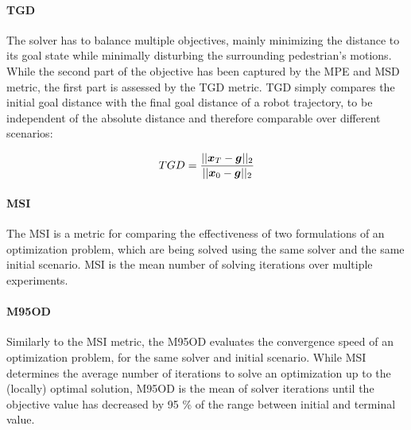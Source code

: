 \paragraph{\ac{TGD}}
The solver has to balance multiple objectives, mainly minimizing the distance to its goal state while minimally disturbing the surrounding pedestrian's motions. While the second part of the objective has been captured by the MPE and MSD metric, the first part is assessed by the \ac{TGD} metric. \ac{TGD} simply compares the initial goal distance with the final goal distance of a robot trajectory, to be independent of the absolute distance and therefore comparable over different scenarios:

\begin{equation}
TGD = \frac{||\boldsymbol{x}_T - \boldsymbol{g}||_2}{||\boldsymbol{x}_0 - \boldsymbol{g}||_2}
\end{equation}

\paragraph{\ac{MSI}}
The \ac{MSI} is a metric for comparing the effectiveness of two formulations of an optimization problem, which are being solved using the same solver and the same initial scenario. \ac{MSI} is the mean number of solving iterations over multiple experiments.

\paragraph{\ac{M95OD}}
Similarly to the \ac{MSI} metric, the \ac{M95OD} evaluates the convergence speed of an optimization problem, for the same solver and initial scenario. While \ac{MSI} determines the average number of iterations to solve an optimization up to the (locally) optimal solution, \ac{M95OD} is the mean of solver iterations until the objective value has decreased by 95 \% of the range between initial and terminal value.
